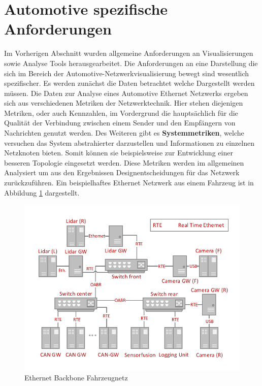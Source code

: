 \documentclass[draft=false
              ,paper=a4
              ,twoside=false
              ,fontsize=11pt
              ,headsepline
              ,BCOR10mm
              ,DIV11
              ]{scrbook}
\begin{document}
\section{Automotive spezifische Anforderungen} %
\label{sec:automotive_spezifische_anforderungen}
Im Vorherigen Abschnitt wurden allgemeine Anforderungen an Visualisierungen sowie Analyse Tools herausgearbeitet. Die Anforderungen an eine Darstellung die sich im Bereich der Automotive-Netzwerkvisualisierung bewegt sind wesentlich spezifischer. Es werden zunächst die Daten betrachtet welche Dargestellt werden müssen. Die Daten zur Analyse eines Automotive Ethernet Netzwerks ergeben sich aus verschiedenen Metriken der Netzwerktechnik. Hier stehen diejenigen Metriken, oder auch Kennzahlen, im Vordergrund die hauptsächlich für die Qualität der Verbindung zwischen einem Sender und den Empfängern von Nachrichten genutzt werden. Des Weiteren gibt es \textbf{Systemmetriken}, welche versuchen das System abstrahierter darzustellen und Informationen zu einzelnen Netzknoten bieten. Somit können sie beispielsweise zur Entwicklung einer besseren Topologie eingesetzt werden. Diese Metriken werden im allgemeinen Analysiert um aus den Ergebnissen Designentscheidungen für das Netzwerk zurückzuführen. Ein beispielhaftes Ethernet Netzwerk aus einem Fahrzeug ist in Abbildung \ref{fig:carnet} dargestellt. 
\begin{figure}[htb]
  \begin{center}
    \includegraphics[width=\textwidth]{img/carnet}
  \end{center}
  \caption{Ethernet Backbone Fahrzeugnetz \cite{b-vkaen-15}}
  \label{fig:carnet}
\end{figure}
\end{document}
